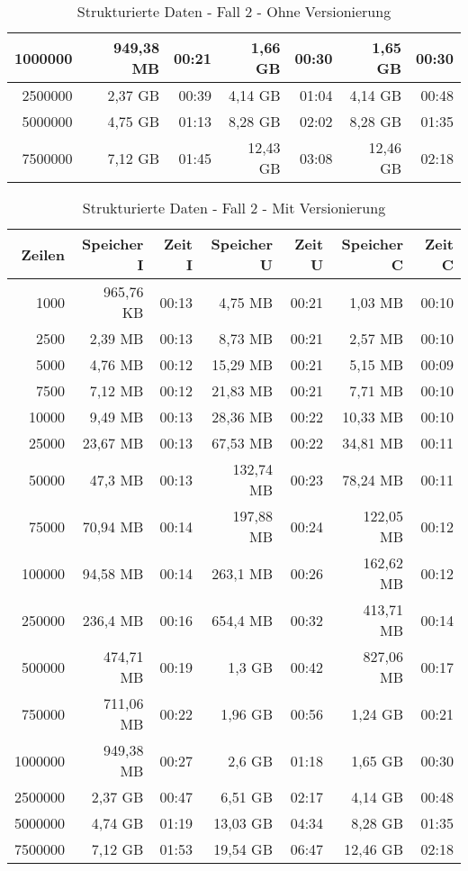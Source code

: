 \begin{table}[h!]
\begin{tabular}{|r|r|r|r|r|r|r|}
        1000000 & 949,38 MB & 00:21 & 1,66 GB   & 00:30 & 1,65 GB   & 00:30 \\ \hline
        2500000 & 2,37 GB   & 00:39 & 4,14 GB   & 01:04 & 4,14 GB   & 00:48 \\ \hline
        5000000 & 4,75 GB   & 01:13 & 8,28 GB   & 02:02 & 8,28 GB   & 01:35 \\ \hline
        7500000 & 7,12 GB   & 01:45 & 12,43 GB  & 03:08 & 12,46 GB  & 02:18 \\ \hline
    \end{tabular}
    \caption{Strukturierte Daten - Fall 2 - Ohne Versionierung}
    \label{tab:sql-80-20-40-updated}
\end{table}

\begin{table}[h!]
    \centering
    \begin{tabular}{|r|r|r|r|r|r|r|}
        \hline
        \textbf{Zeilen} & \textbf{Speicher I} & \textbf{Zeit I} & \textbf{Speicher U} & \textbf{Zeit U} & \textbf{Speicher C} & \textbf{Zeit C} \\ \hline
        1000    & 965,76 KB & 00:13 & 4,75 MB   & 00:21 & 1,03 MB   & 00:10 \\ \hline
        2500    & 2,39 MB   & 00:13 & 8,73 MB   & 00:21 & 2,57 MB	& 00:10 \\ \hline
        5000    & 4,76 MB   & 00:12 & 15,29 MB  & 00:21 & 5,15 MB	& 00:09 \\ \hline
        7500    & 7,12 MB   & 00:12 & 21,83 MB  & 00:21 & 7,71 MB	& 00:10 \\ \hline
        10000   & 9,49 MB   & 00:13 & 28,36 MB	& 00:22 & 10,33 MB	& 00:10 \\ \hline
        25000   & 23,67 MB  & 00:13 & 67,53 MB	& 00:22 & 34,81 MB	& 00:11 \\ \hline
        50000   & 47,3 MB   & 00:13 & 132,74 MB	& 00:23 & 78,24 MB	& 00:11 \\ \hline
        75000   & 70,94 MB  & 00:14 & 197,88 MB	& 00:24 & 122,05 MB	& 00:12 \\ \hline
        100000  & 94,58 MB  & 00:14 & 263,1 MB	& 00:26 & 162,62 MB	& 00:12 \\ \hline
        250000  & 236,4 MB  & 00:16 & 654,4 MB	& 00:32 & 413,71 MB	& 00:14 \\ \hline
        500000  & 474,71 MB & 00:19 & 1,3 GB	& 00:42 & 827,06 MB	& 00:17 \\ \hline
        750000  & 711,06 MB & 00:22 & 1,96 GB	& 00:56 & 1,24 GB   & 00:21 \\ \hline
        1000000 & 949,38 MB & 00:27 & 2,6 GB	& 01:18 & 1,65 GB	& 00:30 \\ \hline
        2500000 & 2,37 GB   & 00:47 & 6,51 GB	& 02:17 & 4,14 GB	& 00:48 \\ \hline
        5000000 & 4,74 GB   & 01:19 & 13,03 GB	& 04:34 & 8,28 GB	& 01:35 \\ \hline
        7500000 & 7,12 GB   & 01:53 & 19,54 GB	& 06:47 & 12,46 GB	& 02:18 \\ \hline
    \end{tabular}
    \caption{Strukturierte Daten - Fall 2 - Mit Versionierung}
    \label{tab:sql-80-20-40-updated}
\end{table}
